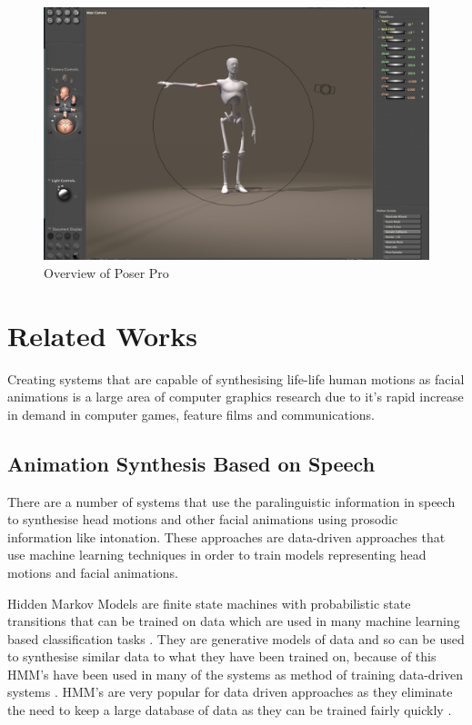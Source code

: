\documentclass[bsc,frontabs,twoside,singlespacing,parskip]{infthesis}
\begin{document}
\begin{figure}
	\centering
		\includegraphics[width=1.0\textwidth]{poser.png}
		\caption{Overview of Poser Pro}
\end{figure}

%

\section{Related Works}

Creating systems that are capable of synthesising life-life human motions as facial animations is a large area of computer graphics research due to it's rapid increase in demand in computer games, feature films and communications.

\subsection{Animation Synthesis Based on Speech}

There are a number of systems that use the paralinguistic information in speech to synthesise head motions and other facial animations using prosodic information like intonation. These approaches are data-driven approaches that use machine learning techniques in order to train models representing head motions and facial animations.

Hidden Markov Models are finite state machines with probabilistic state transitions that can be trained on data which are used in many machine learning based classification tasks \cite{hmms}. They are generative models of data and so can be used to synthesise similar data to what they have been trained on, because of this HMM's have been used in many of the systems as method of training data-driven systems \cite{puppetry}.  HMM's are very popular for data driven approaches as they eliminate the need to keep a large database of data as they can be trained fairly quickly \cite{expressive_speech_animation}. 
\end{document}
